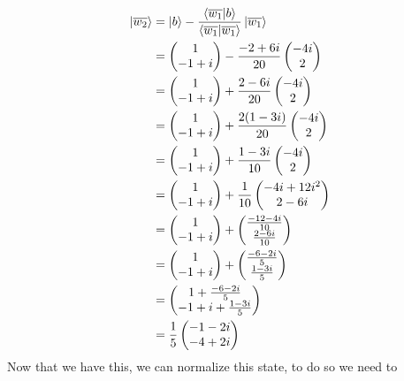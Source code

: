 \documentclass{article}
\begin{document}
\begin{align*}
\ket{\overline{w_2}} &= \ket{b} - \frac{\bra{\overline{w_1}}\ket{b}}{\bra{\overline{w_1}}\ket{\overline{w_1}}} \ket{\overline{w_1}}\\
&= \begin{pmatrix} 1 \\ -1+i \end{pmatrix} - \frac{-2+6i}{20} \begin{pmatrix} -4i \\ 2 \end{pmatrix}\\
&= \begin{pmatrix} 1 \\ -1+i \end{pmatrix} + \frac{2-6i}{20} \begin{pmatrix} -4i \\ 2 \end{pmatrix}\\
&= \begin{pmatrix} 1 \\ -1+i \end{pmatrix} + \frac{2(1-3i)}{20} \begin{pmatrix} -4i \\ 2 \end{pmatrix}\\
&= \begin{pmatrix} 1 \\ -1+i \end{pmatrix} + \frac{1-3i}{10} \begin{pmatrix} -4i \\ 2 \end{pmatrix}\\
&= \begin{pmatrix} 1 \\ -1+i \end{pmatrix} + \frac{1}{10} \begin{pmatrix} -4i+12i^2 \\ 2-6i \end{pmatrix}\\
&= \begin{pmatrix} 1 \\ -1+i \end{pmatrix} + \begin{pmatrix}\frac{-12-4i}{10} \\ \frac{2-6i}{10}\end{pmatrix}\\
&= \begin{pmatrix} 1 \\ -1+i \end{pmatrix} + \begin{pmatrix}\frac{-6-2i}{5} \\ \frac{1-3i}{5}\end{pmatrix}\\
&= \begin{pmatrix} 1 + \frac{-6-2i}{5} \\ -1+i + \frac{1-3i}{5} \end{pmatrix}\\
&= \frac{1}{5} \begin{pmatrix} -1-2i \\ -4+2i \end{pmatrix}
\end{align*}
Now that we have this, we can normalize this state, to do so we need to 


\printindex
\end{document}
